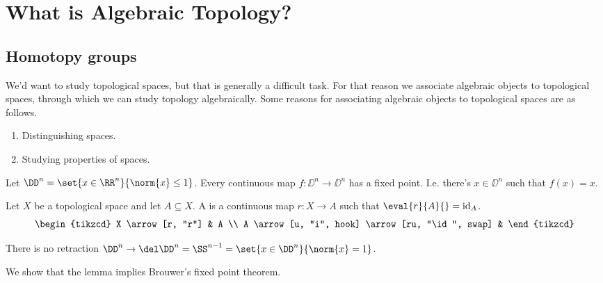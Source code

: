 \documentclass[10pt,a4paper,twoside,openany,hidelinks]{book}
\begin{document}
\section{What is Algebraic Topology?}

\subsection{Homotopy groups}

We'd want to study topological spaces, but that is generally a difficult task. For that reason we associate algebraic objects to topological spaces, through which we can study topology algebraically.
Some reasons for associating algebraic objects to topological spaces are as follows.
\begin{enumerate}
\item Distinguishing spaces.
\item Studying properties of spaces.
\end{enumerate}
\begin{example}
Let $\DD^n = \set{x \in \RR^n}{\norm{x} \leq 1}$.
Every continuous map $f \colon \DD^n \to \DD^n$ has a fixed point.
I.e. there's $x \in \DD^n$ such that $f(x) = x$.
\end{example}
\begin{definition}
Let $X$ be a topological space and let $A \subseteq X$. A  is a continuous map $r \colon X \to A$ such that $\eval{r}{A}{} = \mathrm{id}_A$.
\[
\begin{tikzcd}
X \arrow[r, "r"] & A \\
A \arrow[u, "i", hook] \arrow[ru, "\id", swap] &
\end{tikzcd}
\]
\end{definition}
\begin{lemma}
There is no retraction $\DD^n \to \del \DD^n = \SS^{n-1} = \set{x \in \DD^n}{\norm{x}=1}$.
\end{lemma}
We show that the lemma implies Brouwer's fixed point theorem. \\
\end{document}
